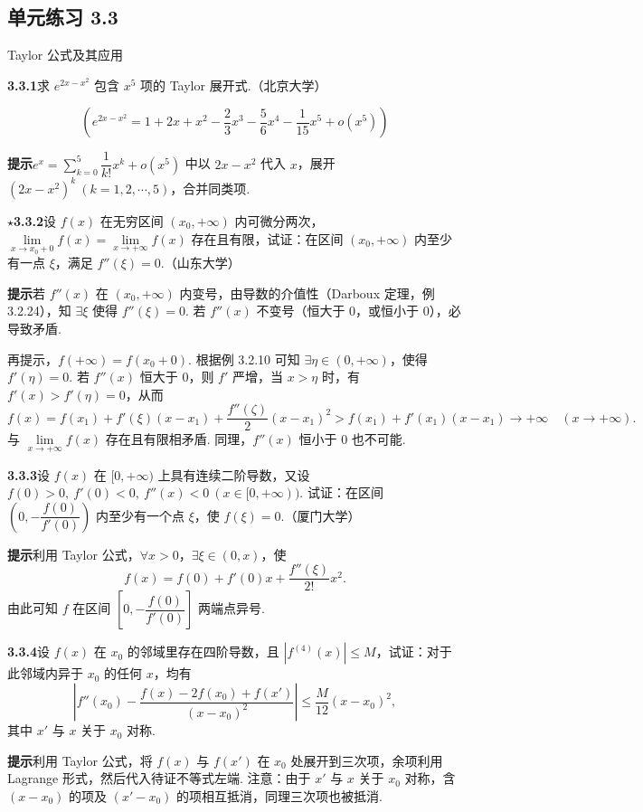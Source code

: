 \documentclass[UTF8, 12pt, fontset=fandol, oneside]{ctexart}
\begin{document}
\subsection*{单元练习 3.3}

\noindent Taylor 公式及其应用

\noindent\textbf{3.3.1}\quad 求 $e^{2x-x^2}$ 包含 $x^5$ 项的 Taylor 展开式.（北京大学）

\[
  \left(e^{2x-x^2}=1+2x+x^2-\frac23x^3-\frac56x^4-\frac1{15}x^5+o(x^5)\right)
\]

\noindent\textbf{提示}\quad $e^x=\sum\limits_{k=0}^5\dfrac1{k!}x^k+o(x^5)$ 中以 $2x-x^2$ 代入 $x$，展开 $(2x-x^2)^k\ (k=1,2,\cdots,5)$，合并同类项.

\noindent\textbf{$\star$3.3.2}\quad 设 $f(x)$ 在无穷区间 $(x_0,+\infty)$ 内可微分两次，$\lim\limits_{x\to x_0+0}f(x)=\lim\limits_{x\to+\infty}f(x)$ 存在且有限，试证：在区间 $(x_0,+\infty)$ 内至少有一点 $\xi$，满足 $f''(\xi)=0$.（山东大学）

\noindent\textbf{提示}\quad 若 $f''(x)$ 在 $(x_0,+\infty)$ 内变号，由导数的介值性（Darboux 定理，例 3.2.24），知 $\exists\xi$ 使得 $f''(\xi)=0$. 若 $f''(x)$ 不变号（恒大于 0，或恒小于 0），必导致矛盾.

再提示，$f(+\infty)=f(x_0+0)$. 根据例 3.2.10 可知 $\exists\eta\in(0,+\infty)$，使得 $f'(\eta)=0$. 若 $f''(x)$ 恒大于 0，则 $f'$ 严增，当 $x>\eta$ 时，有 $f'(x)>f'(\eta)=0$，从而
\[
  f(x)=f(x_1)+f'(\xi)(x-x_1)+\frac{f''(\zeta)}2(x-x_1)^2>f(x_1)+f'(x_1)(x-x_1)\to+\infty\quad(x\to+\infty).
\]
与 $\lim\limits_{x\to+\infty}f(x)$ 存在且有限相矛盾. 同理，$f''(x)$ 恒小于 0 也不可能.

\noindent\textbf{3.3.3}\quad 设 $f(x)$ 在 $[0,+\infty)$ 上具有连续二阶导数，又设 $f(0)>0,\ f'(0)<0,\ f''(x)<0\ (x\in[0,+\infty))$. 试证：在区间 $\left(0,-\dfrac{f(0)}{f'(0)}\right)$ 内至少有一个点 $\xi$，使 $f(\xi)=0$.（厦门大学）

\noindent\textbf{提示}\quad 利用 Taylor 公式，$\forall x>0$，$\exists\xi\in(0,x)$，使
\[
  f(x)=f(0)+f'(0)x+\frac{f''(\xi)}{2!}x^2.
\]
由此可知 $f$ 在区间 $\left[0,-\dfrac{f(0)}{f'(0)}\right]$ 两端点异号.

\noindent\textbf{3.3.4}\quad 设 $f(x)$ 在 $x_0$ 的邻域里存在四阶导数，且 $|f^{(4)}(x)|\le M$，试证：对于此邻域内异于 $x_0$ 的任何 $x$，均有
\[
  \left|f''(x_0)-\frac{f(x)-2f(x_0)+f(x')}{(x-x_0)^2}\right|
  \le \frac{M}{12}(x-x_0)^2,
\]
其中 $x'$ 与 $x$ 关于 $x_0$ 对称.

\noindent\textbf{提示}\quad 利用 Taylor 公式，将 $f(x)$ 与 $f(x')$ 在 $x_0$ 处展开到三次项，余项利用 Lagrange 形式，然后代入待证不等式左端. 注意：由于 $x'$ 与 $x$ 关于 $x_0$ 对称，含 $(x-x_0)$ 的项及 $(x'-x_0)$ 的项相互抵消，同理三次项也被抵消.
\end{document}
